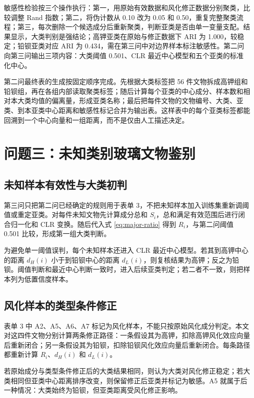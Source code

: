 \documentclass[UTF8,zihao=-4,a4paper,fontset=fandol]{ctexart}
\begin{document}
敏感性检验按三个操作执行：第一，用原始有效数据和风化修正数据分别聚类，比较调整 Rand 指数；第二，将伪计数从 0.10 改为 0.05 和 0.50，重复完整聚类流程；第三，每次删除一个候选成分后重新聚类，判断亚类是否由单一变量支配。结果显示，大类判别是强结论；高钾亚类在原始与修正数据下 ARI 为 1.000，较稳定；铅钡亚类对应 ARI 为 0.434，需在第三问中对边界样本标注敏感性。第二问向第三问输出三项内容：大类阈值 0.501、CLR 最近中心模型和五个亚类的标准化中心。

第二问最终表的生成按固定顺序完成。先根据大类标签把 56 件文物拆成高钾组和铅钡组，再在各组内部读取聚类标签；随后计算每个亚类的中心成分、样本数和相对本大类均值的偏离量，形成亚类名称；最后把每件文物的文物编号、大类、亚类、到本亚类中心距离和敏感性标记合并为输出表。这样表中的每个亚类标签都能回溯到一个中心向量和一组距离，而不是仅由人工描述决定。

\section{问题三：未知类别玻璃文物鉴别}

\subsection{未知样本有效性与大类初判}

第三问只把第二问已经确定的规则用于表单 3，不把未知样本加入训练集重新调阈值或重定亚类。对每件未知文物先计算成分总和 $S_i$，总和满足有效范围后进行闭合归一化和 CLR 变换。随后代入式 \eqref{eq:major-ratio} 得到 $R_i$，与第二问阈值 0.501 比较，形成第一组大类判断。

为避免单一阈值误判，每个未知样本还进入 CLR 最近中心模型。若其到高钾中心的距离 $d_H(i)$ 小于到铅钡中心的距离 $d_L(i)$，则复核结果为高钾；反之为铅钡。阈值判断和最近中心判断一致时，进入后续亚类判定；若二者不一致，则把样本列为低置信度样本。

\subsection{风化样本的类型条件修正}

表单 3 中 A2、A5、A6、A7 标记为风化样本，不能只按原始风化成分判定。本文对这四件文物分别计算两条修正路径：一条假设其为高钾，扣除高钾风化效应向量后重新闭合；另一条假设其为铅钡，扣除铅钡风化效应向量后重新闭合。每条路径都重新计算 $R_i$、$d_H(i)$ 和 $d_L(i)$。

若原始成分与类型条件修正后的大类结果相同，则认为大类对风化修正稳定；若大类相同但亚类中心距离排序改变，则保留修正后亚类并标记为敏感。A5 就属于后一种情况：大类始终为铅钡，但亚类距离受风化修正影响。
\end{document}
